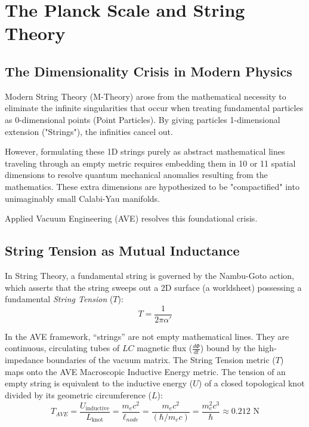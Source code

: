 \chapter{The Planck Scale and String Theory}
\label{ch:string_theory}

\section{The Dimensionality Crisis in Modern Physics}
Modern String Theory (M-Theory) arose from the mathematical necessity to eliminate the infinite singularities that occur when treating fundamental particles as 0-dimensional points (Point Particles). By giving particles 1-dimensional extension ("Strings"), the infinities cancel out.

However, formulating these 1D strings purely as abstract mathematical lines traveling through an empty metric requires embedding them in 10 or 11 spatial dimensions to resolve quantum mechanical anomalies resulting from the mathematics. These extra dimensions are hypothesized to be "compactified" into unimaginably small Calabi-Yau manifolds. 

Applied Vacuum Engineering (AVE) resolves this foundational crisis.

\section{String Tension as Mutual Inductance}
In String Theory, a fundamental string is governed by the Nambu-Goto action, which asserts that the string sweeps out a 2D surface (a worldsheet) possessing a fundamental \textit{String Tension} ($T$):
\begin{equation}
    T = \frac{1}{2\pi\alpha'}
\end{equation}

In the AVE framework, ``strings'' are not empty mathematical lines. They are continuous, circulating tubes of $LC$ magnetic flux ($\frac{d\Phi}{dt}$) bound by the high-impedance boundaries of the vacuum matrix. The String Tension metric ($T$) maps onto the AVE Macroscopic Inductive Energy metric. The tension of an empty string is equivalent to the inductive energy ($U$) of a closed topological knot divided by its geometric circumference ($L$):
\begin{equation}
    T_{AVE} = \frac{U_{\text{inductive}}}{L_{\text{knot}}} = \frac{m_e c^2}{\ell_{node}} = \frac{m_e c^2}{(\hbar / m_e c)} = \frac{m_e^2 c^3}{\hbar} \approx 0.212 \text{ N}
\end{equation}

